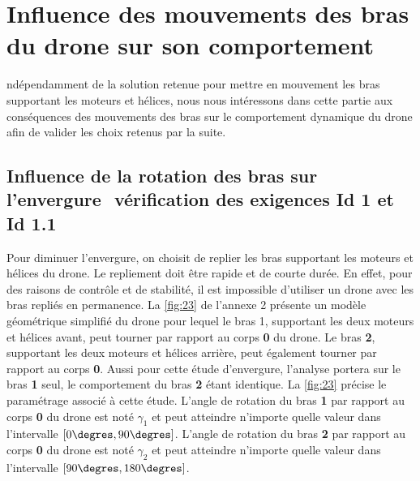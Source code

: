 \section{\label{sec:01} Influence des mouvements des bras du drone sur son comportement}

ndépendamment de la solution retenue pour mettre en mouvement les bras supportant les
moteurs et hélices, nous nous intéressons dans cette partie aux conséquences des mouvements des bras sur le comportement dynamique du drone afin de valider les choix retenus
par la suite.

\subsection{Influence de la rotation des bras sur l’envergure ­ vérification des exigences Id 1
et Id 1.1}

Pour diminuer l’envergure, on choisit de replier les bras supportant les moteurs et hélices du
drone. Le repliement doit être rapide et de courte durée. En effet, pour des raisons de contrôle
et de stabilité, il est impossible d’utiliser un drone avec les bras repliés en permanence. La
\autoref{fig:23} de l’annexe 2 présente un modèle géométrique simplifié du drone pour lequel le
bras 1, supportant les deux moteurs et hélices avant, peut tourner par rapport au corps \textbf{0} du
drone. Le bras \textbf{2}, supportant les deux moteurs et hélices arrière, peut également tourner par
rapport au corps \textbf{0}. Aussi pour cette étude d’envergure, l’analyse portera sur le bras \textbf{1} seul,
le comportement du bras \textbf{2} étant identique. La \autoref{fig:23} précise le paramétrage associé à
cette étude. L’angle de rotation du bras \textbf{1} par rapport au corps \textbf{0} du drone est noté $\gamma_1$ et peut
atteindre n’importe quelle valeur dans l’intervalle $[0\degres, 90\degres]$.
L’angle de rotation du bras \textbf{2} par rapport au corps \textbf{0} du drone est noté $\gamma_2$ et peut atteindre
n’importe quelle valeur dans l’intervalle $[90\degres, 180\degres]$.

\ifprof
\begin{corrige}
\end{corrige}
\else
\fi

\ifprof
\begin{corrige}
\end{corrige}
\else
\fi


